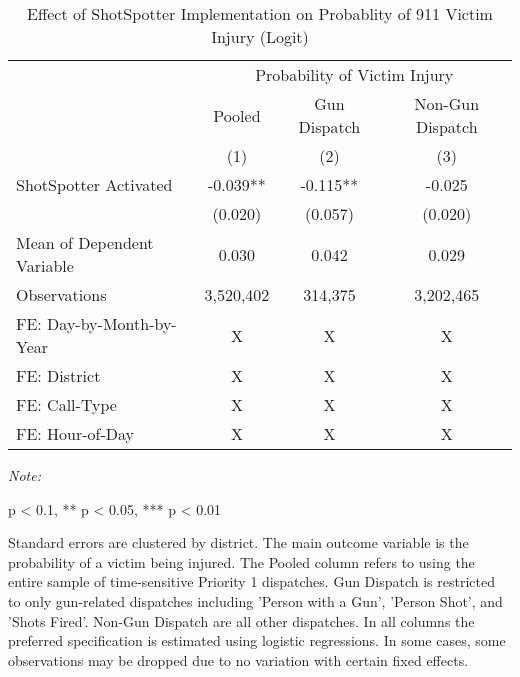 \begin{table}[H]

\caption{\label{victim_table_logit}Effect of ShotSpotter Implementation on Probablity of 911 Victim Injury (Logit)}
\centering
\begin{threeparttable}
\fontsize{11}{13}\selectfont
\begin{tabular}[t]{>{\raggedright\arraybackslash}p{8cm}ccc}
\toprule
\multicolumn{1}{c}{ } & \multicolumn{3}{c}{Probability of Victim Injury} \\
\cmidrule(l{3pt}r{3pt}){2-4}
\multicolumn{1}{c}{ } & \multicolumn{1}{c}{Pooled} & \multicolumn{1}{c}{Gun Dispatch} & \multicolumn{1}{c}{Non-Gun Dispatch} \\
\cmidrule(l{3pt}r{3pt}){2-2} \cmidrule(l{3pt}r{3pt}){3-3} \cmidrule(l{3pt}r{3pt}){4-4}
  & (1) & (2) & (3)\\
\midrule
ShotSpotter Activated & -0.039** & -0.115** & -0.025\\
 & (0.020) & (0.057) & (0.020)\\
Mean of Dependent Variable & 0.030 & 0.042 & 0.029\\
Observations & 3,520,402 & 314,375 & 3,202,465\\
\midrule
FE: Day-by-Month-by-Year & X & X & X\\
\addlinespace
FE: District & X & X & X\\
FE: Call-Type & X & X & X\\
FE: Hour-of-Day & X & X & X\\
\bottomrule
\end{tabular}
\begin{tablenotes}
\item \textit{Note: } 
\item * p < 0.1, ** p < 0.05, *** p < 0.01
\item Standard errors are clustered by district.                       The main outcome variable is the probability of a victim being                      injured.                      The Pooled column refers to using the entire sample of time-sensitive Priority 1                      dispatches.                      Gun Dispatch is restricted to only gun-related dispatches including                      'Person with a Gun', 'Person Shot', and 'Shots Fired'. Non-Gun Dispatch are all other                      dispatches. In all columns the preferred specification is estimated using                      logistic regressions. In some cases,                  some observations may be dropped due to no variation                  with certain fixed effects.                                    
\end{tablenotes}
\end{threeparttable}
\end{table}
